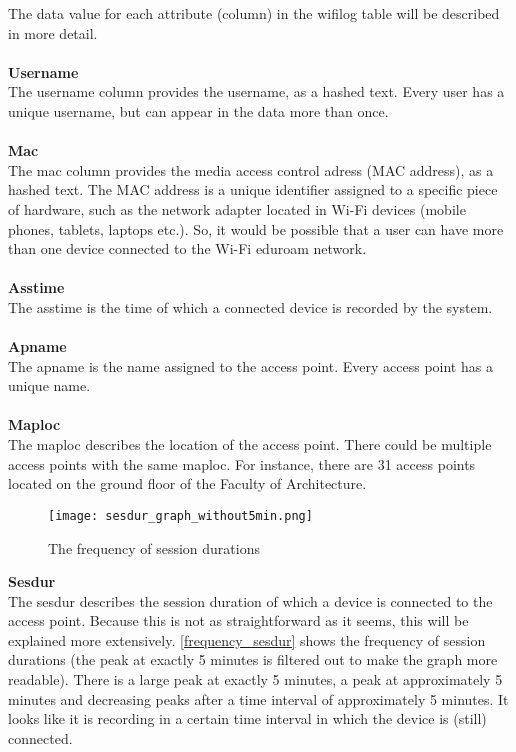 The data value for each attribute (column) in the wifilog table will be described in more detail.\\\\
\textbf{Username}\\
The username column provides the username, as a hashed text. Every user has a unique username, but can appear in the data more than once.
\\\\
\textbf{Mac}\\
The mac column provides the media access control adress (MAC address), as a hashed text. The MAC address is a unique identifier assigned to a specific piece of hardware, such as the network adapter located in Wi-Fi devices (mobile phones, tablets, laptops etc.). So, it would be possible that a user can have more than one device connected to the Wi-Fi eduroam network.
\\\\
\textbf{Asstime}\\
The asstime is the time of which a connected device is recorded by the system.
\\\\
\textbf{Apname}\\
The apname is the name assigned to the access point. Every access point has a unique name. 
\\\\
\textbf{Maploc}\\
The maploc describes the location of the access point. There could be multiple access points with the same maploc. For instance, there are 31 access points located on the ground floor of the Faculty of Architecture.\\
\begin{figure}[H]
	\centering
	\texttt{[image: sesdur\_graph\_without5min.png]}
	\captionsetup{justification=centering}
	\caption{The frequency of session durations}
	\label{frequency_sesdur}
\end{figure}
\textbf{Sesdur}\\
The sesdur describes the session duration of which a device is connected to the access point. Because this is not as straightforward as it seems, this will be explained more extensively. \autoref{frequency_sesdur} shows the frequency of session durations (the peak at exactly 5 minutes is filtered out to make the graph more readable). There is a large peak at exactly 5 minutes, a peak at approximately 5 minutes and decreasing peaks after a time interval of approximately 5 minutes. It looks like it is recording in a certain time interval in which the device is (still) connected. \\\\
